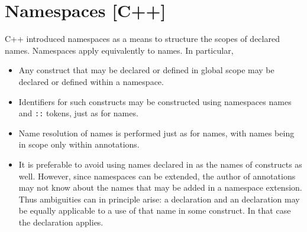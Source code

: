\section{Namespaces [C++]}
\label{sec:namespaces}

C++ introduced namespaces as a means to structure the scopes of declared names. Namespaces apply equivalently to \NAME{} 
names. In particular,
\begin{itemize}
\item Any \NAME{} construct that may be declared or defined 
in global scope may be declared or defined within a namespace.
\item Identifiers for such constructs may be constructed using namespaces names and \lstinline|::| tokens, just as for \lang{} names.
\item Name resolution of \NAME{} names is performed just as for \lang{} names, with \NAME{} names being in scope only within \NAME{} annotations.
\item It is preferable to avoid using names declared in \lang{} as the names of \NAME{} constructs as well. However, since namespaces can be extended, the author of \NAME{} annotations may not know about the \lang{} names that may be added in a namespace extension. Thus ambiguities can in
principle arise: a \lang{} declaration and an \NAME{}
declaration may be equally applicable to a use of that name 
in some \NAME{} construct. In that case the \NAME{} declaration applies.

\end{itemize}

